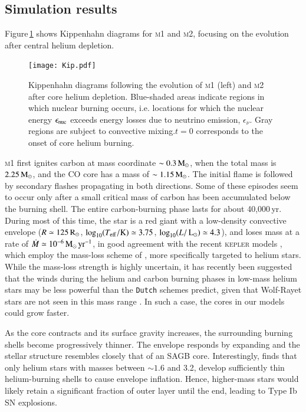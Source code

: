\documentclass[twocolumn]{aa}
\begin{document}
\subsection{Simulation results}
Figure\,\ref{fig:1} shows Kippenhahn diagrams for 
 \textsc{m1} and \textsc{m2}, focusing on the evolution after central helium depletion.
\begin{figure}[htb!]
  \centering 
  \texttt{[image: Kip.pdf]}
  \caption{Kippenhahn diagrams following the evolution of \textsc{m1} (left) and \textsc{m2} after core helium depletion. Blue-shaded areas indicate regions in which nuclear burning occurs, i.e. locations for which the nuclear energy $\epsilon_{\rm nuc}$ exceeds energy losses due to neutrino emission, $\epsilon_\nu$. Gray regions are subject to convective mixing.$t=0$ corresponds to the onset of core helium burning.}
  \label{fig:1}
\end{figure}
\textsc{m1} first ignites carbon at mass coordinate $\sim 0.3\mathrm{\,M_\odot}$, when the total mass  is $ 2.25\mathrm{\,M_\odot}$, and the CO core has a mass of $\sim 1.15\mathrm{\,M_\odot}$.  
The initial flame is followed by secondary flashes propagating in both 
directions. Some of these episodes seem to occur only after a small critical 
mass of carbon has been accumulated below the burning shell. The entire carbon-burning phase lasts for about 
40,000\,yr. During most of this time, the star is a red giant with a low-density convective envelope  
($R\simeq 125\mathrm{\,R_\odot}$, $\log_{10} (T_{\mathrm{eff}} /\mathrm{K})\simeq 3.75$, $\log_{10} (L/\mathrm{\,L_\odot})\simeq 
4.3$), and loses mass at a rate of  
$\dot{M}\simeq10^{-6}\mathrm{\,M_{\odot}\,yr^{-1}}$, in good agreement with the
recent \textsc{kepler} models \citep{Woosley:2019sdf}, which employ the mass-loss scheme of \cite{Yoon:2017dme}, more specifically targeted to helium stars. While the mass-loss strength is highly uncertain, it has recently been suggested that the winds during the helium and carbon burning phases in low-mass helium stars may be less powerful than the \texttt{Dutch} schemes predict, given that Wolf-Rayet stars are not seen in this mass range \citep{Vink:2017ujd}. In such a case, the cores in our models could grow faster.

As the core contracts and its surface gravity increases, the surrounding burning shells become progressively thinner. The envelope responds by expanding  and the stellar structure resembles closely that of an SAGB core. Interestingly, \cite{Woosley:2019sdf} finds that only helium stars with masses between $\sim 1.6$ and 3.2\msun, develop sufficiently thin helium-burning shells to cause envelope inflation. Hence, higher-mass stars would likely retain a significant fraction of outer layer until the end, leading to Type Ib SN explosions.
\end{document}
